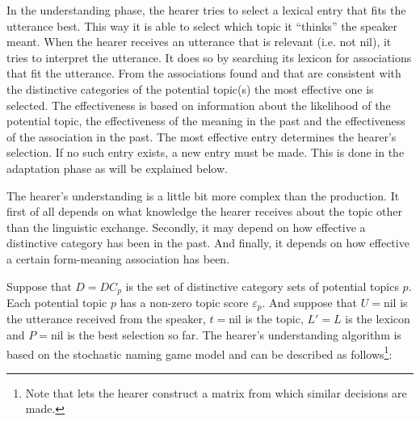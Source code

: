 In the understanding phase, the hearer tries to select a lexical entry that fits the utterance best. This way it is able to select which topic it ``thinks'' the speaker meant. When the hearer receives an utterance that is relevant (i.e. not nil), it tries to interpret the utterance. It does so by searching its lexicon for associations that fit the utterance. From the associations found and that are consistent with the distinctive categories of the potential topic(s) the most effective one is selected. The effectiveness is based on information about the likelihood of the potential topic, the effectiveness of the meaning in the past and the effectiveness of the association in the past. The most effective entry determines the hearer's selection. If no such entry exists, a new entry must be made. This is done in the adaptation phase as will be explained below.

The hearer's understanding is a little bit more complex than the production. It first of all depends on what knowledge the hearer receives about the topic other than the linguistic exchange. Secondly, it may depend on how effective a distinctive category has been in the past. And finally, it depends on how effective a certain form-meaning association has been. 


Suppose that $D={DC_p}$ is the set of distinctive category sets of potential topics $p$. Each potential topic $p$ has a non-zero topic score $\varepsilon_p$. And suppose that $U=\mbox{nil}$ is the utterance received from the speaker, $t=\mbox{nil}$ is the topic, $L'=L$ is the lexicon and $P=\mbox{nil}$ is the best selection so far. The hearer's understanding algorithm is based on the stochastic naming game model \citep{steelskaplan:1998} and can be described as follows\footnote{Note that \citet{steelskaplan:1998} lets the hearer construct a matrix from which similar decisions are made.}:

